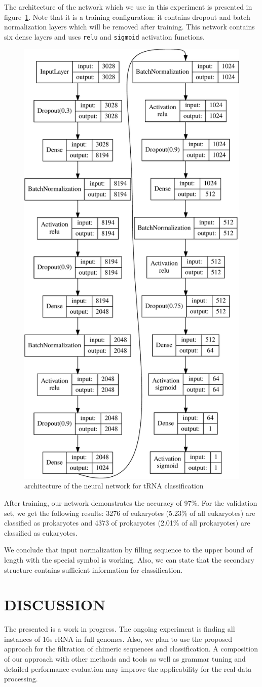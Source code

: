 \documentclass[a4paper,twoside]{article}
\begin{document}
The architecture of the network which we use in this experiment is presented in figure~\ref{fig:nn}.
Note that it is a training configuration: it contains dropout and batch normalization layers which will be removed after training.
This network contains six dense layers and uses \verb|relu| and \verb|sigmoid| activation functions.

\begin{figure}
\centering
\includegraphics[width=.4\textwidth]{figures/model-crop.pdf}
\caption{architecture of the neural network for tRNA classification}
\label{fig:nn}
\end{figure}

After training, our network demonstrates the accuracy of 97\%. 
For the validation set, we get the following results: 3276 of eukaryotes (5.23\% of all eukaryotes) are classified as prokaryotes and 4373 of prokaryotes (2.01\% of all prokaryotes) are classified as eukaryotes. 

We conclude that input normalization by filling sequence to the upper bound of length with the special symbol is working.
Also, we can state that the secondary structure contains sufficient information for classification.


\section{\uppercase{Discussion}}
\label{sec:Discussion}

\noindent The presented is a work in progress. 
The ongoing experiment is finding all instances of 16s rRNA in full genomes.
Also, we plan to use the proposed approach for the filtration of chimeric sequences and classification.
A composition of our approach with other methods and tools as well as grammar tuning and detailed performance evaluation may improve the applicability for the real data processing.
\end{document}
